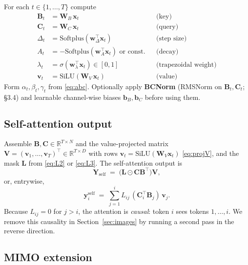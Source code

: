 \documentclass[11pt,a4paper]{article}
\begin{document}
For each $t\in\{1,\dots,T\}$ compute
\begin{align}
  \bm{B}_t &= \bm{W}_B\,\bm{x}_t        & &\text{(key)} \\
  \bm{C}_t &= \bm{W}_C\,\bm{x}_t        & &\text{(query)} \\
  \Delta_t &= \mathrm{Softplus}(\bm{w}_\Delta^\top\bm{x}_t) & &\text{(step size)}\\
  A_t &= -\mathrm{Softplus}(\bm{w}_A^\top\bm{x}_t) \text{ or const.} & &\text{(decay)} \\
  \lambda_t &= \sigma(\bm{w}_\lambda^\top\bm{x}_t)\in[0,1] & &\text{(trapezoidal weight)} \\
  \bm{v}_t &= \mathrm{SiLU}(\bm{W}_V\,\bm{x}_t)         & &\text{(value)}
\end{align}
Form $\alpha_t,\beta_t,\gamma_t$ from \eqref{eq:abc}. Optionally apply
\textbf{BCNorm} (RMSNorm on $\bm{B}_t,\bm{C}_t$; \cite{mamba3}
\S 3.4) and learnable channel-wise biases $\bm{b}_B, \bm{b}_C$ before
using them.

\subsection{Self-attention output}

Assemble $\bm{B},\bm{C}\in\mathbb{R}^{T\times N}$ and the
value-projected matrix
$\bm{V} = (\bm{v}_1,\dots,\bm{v}_T)^\top\in\mathbb{R}^{T\times D}$
with rows $\bm{v}_t = \mathrm{SiLU}(\bm{W}_V\bm{x}_t)$
\eqref{eq:projV}, and the mask
$\bm{L}$ from \eqref{eq:L2} or \eqref{eq:L3}. The self-attention
output is
\begin{equation}\label{eq:self-out}
  \bm{Y}_{\text{self}} \;=\; \bigl(\bm{L}\odot\bm{C}\bm{B}^\top\bigr)\bm{V},
\end{equation}
or, entrywise,
\begin{equation}\label{eq:self-entry}
  \bm{y}_i^{\text{self}} \;=\; \sum_{j=1}^{i} L_{ij}\,(\bm{C}_i^\top \bm{B}_j)\,\bm{v}_j.
\end{equation}
Because $L_{ij}=0$ for $j>i$, the attention is \emph{causal}: token
$i$ sees tokens $1,\dots,i$. We remove this causality in
Section~\ref{sec:images} by running a second pass in the reverse
direction.

\subsection{MIMO extension}\label{sec:mimo}
\end{document}
